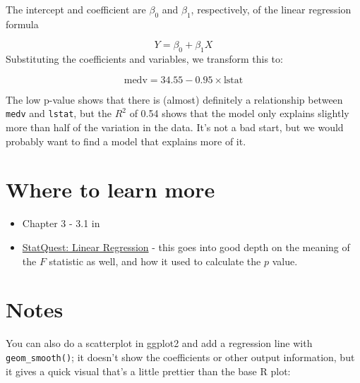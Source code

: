 \documentclass[
]{book}
\providecommand{\tightlist}{%
  \setlength{\itemsep}{0pt}\setlength{\parskip}{0pt}}
\begin{document}
The intercept and coefficient are \(\beta_0\) and \(\beta_1\), respectively, of the linear regression formula

\[Y = \beta_0 + \beta_1X\]
Substituting the coefficients and variables, we transform this to:

\[\text{medv} = 34.55 - 0.95 \times \text{lstat}\]

The low p-value shows that there is (almost) definitely a relationship between \texttt{medv} and \texttt{lstat}, but the \(R^2\) of 0.54 shows that the model only explains slightly more than half of the variation in the data. It's not a bad start, but we would probably want to find a model that explains more of it.

\hypertarget{where-to-learn-more}{%
\section{Where to learn more}\label{where-to-learn-more}}

\begin{itemize}
\tightlist
\item
  Chapter 3 - 3.1 in \citet{ISLR}
\item
  \href{https://www.youtube.com/watch?v=nk2CQITm_eo}{StatQuest: Linear Regression} - this goes into good depth on the meaning of the \(F\) statistic as well, and how it used to calculate the \(p\) value.
\end{itemize}

\hypertarget{notes}{%
\section{Notes}\label{notes}}

You can also do a scatterplot in ggplot2 and add a regression line with \texttt{geom\_smooth()}; it doesn't show the coefficients or other output information, but it gives a quick visual that's a little prettier than the base R plot:
\end{document}
